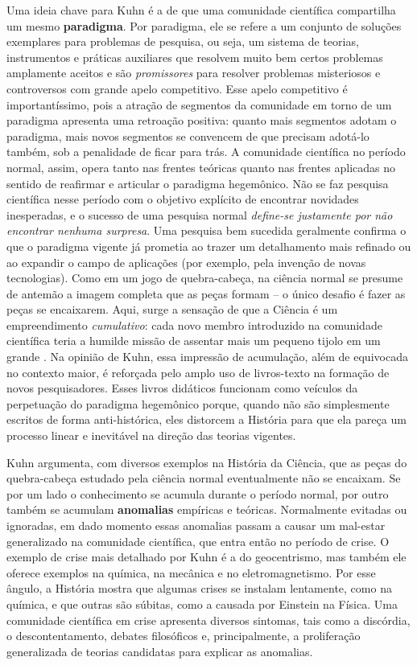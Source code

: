 \documentclass[./main.tex]{subfiles}
\begin{document}
\par Uma ideia chave para Kuhn é a de que uma comunidade científica compartilha um mesmo \textbf{\gls{paradigma}}. Por \gls{paradigma}, ele se refere a um conjunto de soluções exemplares para problemas de pesquisa, ou seja, um sistema de teorias, instrumentos e práticas auxiliares que resolvem muito bem certos problemas amplamente aceitos e são \textit{promissores} para resolver problemas misteriosos e controversos com grande apelo competitivo. Esse apelo competitivo é importantíssimo, pois a atração de segmentos da comunidade em torno de um \gls{paradigma} apresenta uma retroação positiva: quanto mais segmentos adotam o \gls{paradigma}, mais novos segmentos se convencem de que precisam adotá-lo também, sob a penalidade de ficar para trás. A comunidade científica no período normal, assim, opera tanto nas frentes teóricas quanto nas frentes aplicadas no sentido de reafirmar e articular o \gls{paradigma} hegemônico. Não se faz pesquisa científica nesse período com o objetivo explícito de encontrar novidades inesperadas, e o sucesso de uma pesquisa normal \textit{define-se justamente por não encontrar nenhuma surpresa}. Uma pesquisa bem sucedida geralmente confirma o que o \gls{paradigma} vigente já prometia ao trazer um detalhamento mais refinado ou ao expandir o campo de aplicações (por exemplo, pela invenção de novas tecnologias). Como em um jogo de quebra-cabeça, na ciência normal se presume de antemão a imagem completa que as peças formam – o único desafio é fazer as peças se encaixarem. Aqui, surge a sensação de que a Ciência é um empreendimento \textit{cumulativo}: cada novo membro introduzido na comunidade científica teria a humilde missão de assentar mais um pequeno tijolo em um grande . Na opinião de Kuhn, essa impressão de acumulação, além de equivocada no contexto maior, é reforçada pelo amplo uso de livros-texto na formação de novos pesquisadores. Esses livros didáticos funcionam como veículos da perpetuação do \gls{paradigma} hegemônico porque, quando não são simplesmente escritos de forma anti-histórica, eles distorcem a História para que ela pareça um processo linear e inevitável na direção das teorias vigentes.

\par Kuhn argumenta, com diversos exemplos na História da Ciência, que as peças do quebra-cabeça estudado pela ciência normal eventualmente não se encaixam. Se por um lado o conhecimento se acumula durante o período normal, por outro também se acumulam \textbf{anomalias} empíricas e teóricas. Normalmente evitadas ou ignoradas, em dado momento essas anomalias passam a causar um mal-estar generalizado na comunidade científica, que entra então no período de crise. O exemplo de crise mais detalhado por Kuhn é a do geocentrismo, mas também ele oferece exemplos na química, na mecânica e no eletromagnetismo. Por esse ângulo, a História mostra que algumas crises se instalam lentamente, como na química, e que outras são súbitas, como a causada por Einstein na Física. Uma comunidade científica em crise apresenta diversos sintomas, tais como a discórdia, o descontentamento, debates filosóficos e, principalmente, a proliferação generalizada de teorias candidatas para explicar as anomalias.
\end{document}
